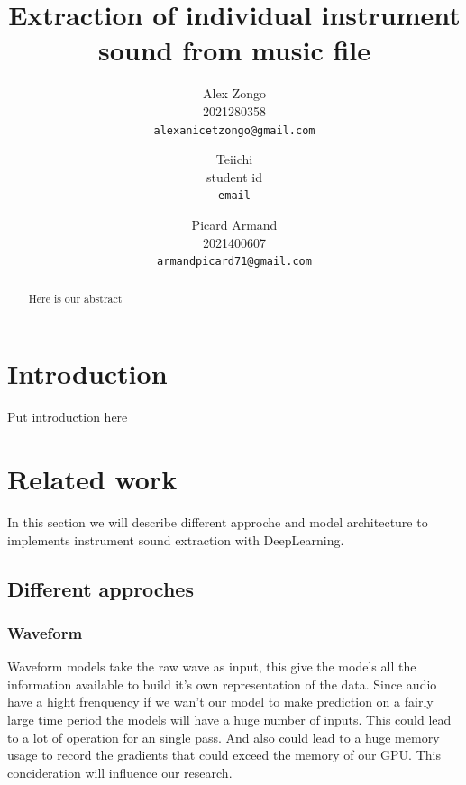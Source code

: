 \documentclass[final]{cvpr}
\begin{document}
\title{Extraction of individual instrument sound from music file}

\author{Alex Zongo\\
2021280358\\
{\tt\small alexanicetzongo@gmail.com}
\and
Teiichi\\
student id\\
{\tt\small email}
\and
Picard Armand\\
2021400607\\
{\tt\small armandpicard71@gmail.com}
}

\maketitle


\begin{abstract}
Here is our abstract
\end{abstract}

\section{Introduction}

Put introduction here

\section{Related work}

In this section we will describe different approche and model architecture to implements instrument sound extraction with DeepLearning.

\subsection{Different approches}
\subsubsection{Waveform}

Waveform models take the raw wave as input, this give the models all the information available to build it's own representation of the data.
Since audio have a hight frenquency if we wan't our model to make prediction on a fairly large time period the models will have a huge number of inputs.
This could lead to a lot of operation for an single pass.
And also could lead to a huge memory usage to record the gradients that could exceed the memory of our GPU.
This concideration will influence our research.
\end{document}
